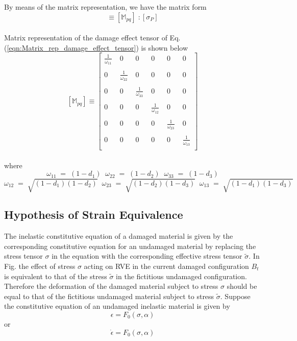 \documentclass[a4paper,12pt]{extarticle}
\begin{document}
By means of the matrix representation, we have the matrix form
\begin{equation}
[\tilde{\sigma_{P}}] \equiv [\mathbb{M}_{pq}]\;: [\sigma_{P}]
\label{eqn:Matrix_rep_damage_effect_tensor}
\end{equation}
\\
Matrix representation of the damage effect tensor of Eq.(\ref{eqn:Matrix_rep_damage_effect_tensor}) is shown below
\\
$$
[\mathbb{M}_{pq}] \equiv   
 \begin{bmatrix}
   \frac{1}{\omega_{11}}  \; & 0 \; & 0 \; & 0 \; & 0\; & 0 \\
  \\
  0\; & \frac{1}{\omega_{22}}\; & 0\; & 0\; & 0\; & 0 \\
  \\
  0\; & 0 \; & \frac{1}{\omega_{33}}\; & 0\; & 0\; & 0 \\
  \\
  0\; & 0\; & 0\; & \frac{1}{\omega_{12}}\; & 0\; & 0 \\
  \\
  0\; & 0\; & 0\; & 0\; & \frac{1}{\omega_{23}}\; & 0 \\
  \\
  0\; & 0\; & 0\; & 0\; & 0\; & \frac{1}{\omega_{13}}  
  \\
 \end{bmatrix}
 \label{Damage_effect_tensor}
 $$
\\
where
$$\omega_{11} \; = \; (1 - d_{1}) \;\;  \omega_{22} \; = \; (1 - d_{2}) \;\; \omega_{33} \; = \; (1 - d_{3})$$ \vspace*{0.1cm} $$\omega_{12} \; = \; \sqrt{(1 - d_{1})(1 - d_{2})}  \;\;\omega_{23} \; = \; \sqrt{(1 - d_{2})(1 - d_{3})} \;\; \omega_{13} \; = \; \sqrt{(1 - d_{1})(1 - d_{3})}$$

\subsection{Hypothesis of Strain Equivalence}\label{Hypothesis of Strain Equivalence}

\indent\indent\indent The inelastic constitutive equation of a damaged material is given by the corresponding constitutive equation for an undamaged material by replacing the stress tensor $\sigma$ in the equation with the corresponding effective stress tensor $\tilde{\sigma}$. In Fig. the effect of stress $\sigma$ acting on RVE in the current damaged configuration $B_{t}$ is equivalent to that of the stress $\tilde{\sigma}$ in the fictitious undamaged configuration. Therefore the deformation of the damaged material subject to stress $\sigma$ should be equal to that of the fictitious undamaged material subject to stress $\tilde{\sigma}$. Suppose the constitutive equation of an undamaged inelastic material is given by
\begin{equation}
  \epsilon = F_{0}(\sigma, \alpha)
\end{equation} 
or
\begin{equation}
  \dot{\epsilon} = F_{0}(\sigma, \alpha)
\end{equation}
\end{document}
